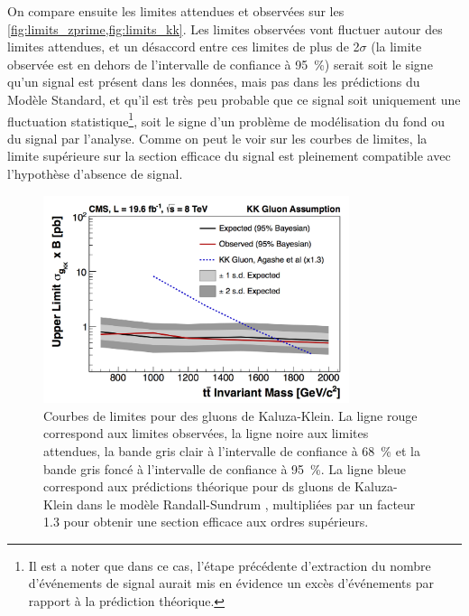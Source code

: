 On compare ensuite les limites attendues et observées sur les \cref{fig:limits_zprime,fig:limits_kk}. Les limites observées vont fluctuer autour des limites attendues, et un désaccord entre ces limites de plus de 2$\sigma$ (la limite observée est en dehors de l'intervalle de confiance à \SI{95}{\%}) serait soit le signe qu'un signal est présent dans les données, mais pas dans les prédictions du Modèle Standard, et qu'il est très peu probable que ce signal soit uniquement une fluctuation statistique\footnote{Il est a noter que dans ce cas, l'étape précédente d'extraction du nombre d'événements de signal aurait mis en évidence un excès d'événements par rapport à la prédiction théorique.}, soit le signe d'un problème de modélisation du fond ou du signal par l'analyse. Comme on peut le voir sur les courbes de limites, la limite supérieure sur la section efficace du signal est pleinement compatible avec l'hypothèse d'absence de signal.

\begin{figure}[tbp] \centering
    \includegraphics[width=0.8\textwidth]{chapitre7/figs/low-mass-limits-kk.png}
    \caption{Courbes de limites pour des gluons de Kaluza-Klein. La ligne rouge correspond aux limites observées, la ligne noire aux limites attendues, la bande gris clair à l'intervalle de confiance à \SI{68}{\percent} et la bande gris foncé à l'intervalle de confiance à \SI{95}{\%}. La ligne bleue correspond aux prédictions théorique pour ds gluons de Kaluza-Klein dans le modèle Randall-Sundrum \citep{Agashe:2006hk}, multipliées par un facteur \num{1.3} pour obtenir une section efficace aux ordres supérieurs.}
    \label{fig:limits_kk}
\end{figure}

\medskip

